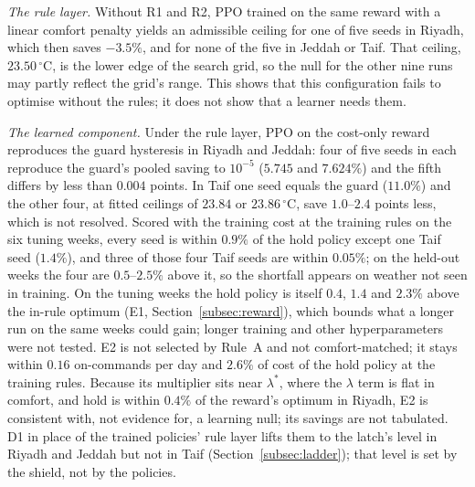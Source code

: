 \documentclass[3p,twocolumn,number]{elsarticle}
\begin{document}
\emph{The rule layer.} Without R1 and R2, PPO trained on the same reward with a linear comfort penalty yields an admissible ceiling for one of five seeds in Riyadh, which then saves $-3.5\%$, and for none of the five in Jeddah or Taif. That ceiling, $23.50\,^\circ$C, is the lower edge of the search grid, so the null for the other nine runs may partly reflect the grid's range. This shows that this configuration fails to optimise without the rules; it does not show that a learner needs them.

\emph{The learned component.} Under the rule layer, PPO on the cost-only reward reproduces the guard hysteresis in Riyadh and Jeddah: four of five seeds in each reproduce the guard's pooled saving to $10^{-5}$ ($5.745$ and $7.624\%$) and the fifth differs by less than $0.004$ points. In Taif one seed equals the guard ($11.0\%$) and the other four, at fitted ceilings of $23.84$ or $23.86\,^\circ$C, save $1.0$--$2.4$ points less, which is not resolved. Scored with the training cost at the training rules on the six tuning weeks, every seed is within $0.9\%$ of the hold policy except one Taif seed ($1.4\%$), and three of those four Taif seeds are within $0.05\%$; on the held-out weeks the four are $0.5$--$2.5\%$ above it, so the shortfall appears on weather not seen in training. On the tuning weeks the hold policy is itself $0.4$, $1.4$ and $2.3\%$ above the in-rule optimum (E1, Section~\ref{subsec:reward}), which bounds what a longer run on the same weeks could gain; longer training and other hyperparameters were not tested. E2 is not selected by Rule~A and not comfort-matched; it stays within $0.16$ on-commands per day and $2.6\%$ of cost of the hold policy at the training rules. Because its multiplier sits near $\lambda^\ast$, where the $\lambda$ term is flat in comfort, and hold is within $0.4\%$ of the reward's optimum in Riyadh, E2 is consistent with, not evidence for, a learning null; its savings are not tabulated. D1 in place of the trained policies' rule layer lifts them to the latch's level in Riyadh and Jeddah but not in Taif (Section~\ref{subsec:ladder}); that level is set by the shield, not by the policies.
\end{document}
